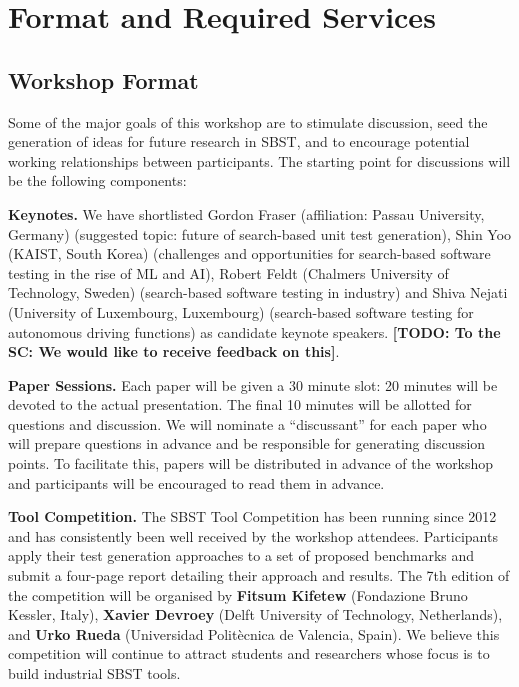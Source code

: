 \documentclass[10pt,conference]{IEEEtran}
\newcommand{\TODO}[1]{\textbf{\textcolor{ScarletRed}{[TODO: #1]}}\xspace}
\newcommand{\TODO}[1]{}
\begin{document}
\section{Format and Required Services}

\subsection{Workshop Format}

Some of the major goals of this workshop are to stimulate discussion,
seed the generation of ideas for future research in SBST, and to
encourage potential working relationships between participants.  The
starting point for discussions will be the following components:

{\bf Keynotes.}  We have shortlisted Gordon Fraser (affiliation:
Passau University, Germany) (suggested topic: future of search-based
unit test generation), Shin Yoo (KAIST, South Korea) (challenges and
opportunities for search-based software testing in the rise of ML and
AI), Robert Feldt (Chalmers University of Technology, Sweden)
(search-based software testing in industry) and Shiva Nejati
(University of Luxembourg, Luxembourg) (search-based software testing
for autonomous driving functions) as candidate keynote
speakers. \TODO{To the SC: We would like to receive feedback on this}. %

{\bf Paper Sessions.}  Each paper will be given a 30
minute slot: 20 minutes will be devoted to the
actual presentation.  The final 10 minutes will be allotted for
questions and discussion.  We will nominate a ``discussant'' for each
paper who will prepare questions in advance and be responsible for
generating discussion points. To facilitate this, papers will be
distributed in advance of the workshop and participants will be
encouraged to read them in advance.

{\bf Tool Competition.} The SBST Tool Competition has been running
since 2012 and has consistently been well received by the workshop
attendees. Participants apply their test generation approaches to a
set of proposed benchmarks and submit a four-page report detailing
their approach and results. The 7th edition of the competition will be
organised by {\bf Fitsum Kifetew} (Fondazione Bruno Kessler, Italy),
{\bf Xavier Devroey} (Delft University of Technology, Netherlands),
and {\bf Urko Rueda} (Universidad Politècnica de Valencia, Spain). We
believe this competition will continue to attract students and
researchers whose focus is to build industrial SBST tools.
\end{document}
